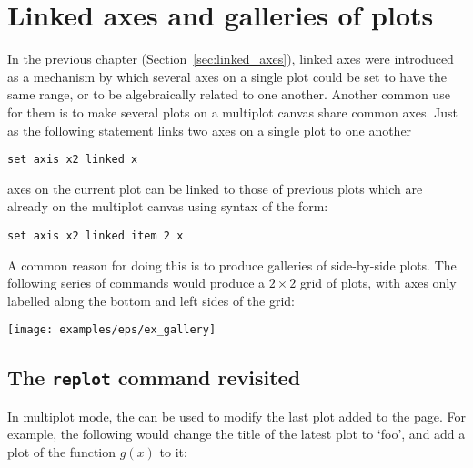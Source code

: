 
\section{Linked axes and galleries of plots}

In the previous chapter (Section~\ref{sec:linked_axes}), linked axes were
introduced as a mechanism by which several axes on a single plot could be set
to have the same range, or to be algebraically related to one another. Another
common use for them is to make several plots on a multiplot canvas share common
axes. Just as the following statement links two axes on a single plot to one
another
\begin{verbatim}
set axis x2 linked x
\end{verbatim}
axes on the current plot can be linked to those of previous plots which are
already on the multiplot canvas using syntax of the form:
\begin{verbatim}
set axis x2 linked item 2 x
\end{verbatim}

A common reason for doing this is to produce galleries of side-by-side plots.
The following series of commands would produce a $2\times2$ grid of plots, with
axes only labelled along the bottom and left sides of the grid:

\vspace{3mm}

\vspace{3mm}

\centerline{\texttt{[image: examples/eps/ex\_gallery]}}

\subsection{The {\tt replot} command revisited}

In multiplot mode, the  can be used to modify the last plot
added to the page. For example, the following would change the title of the
latest plot to `foo', and add a plot of the function $g(x)$ to it:

